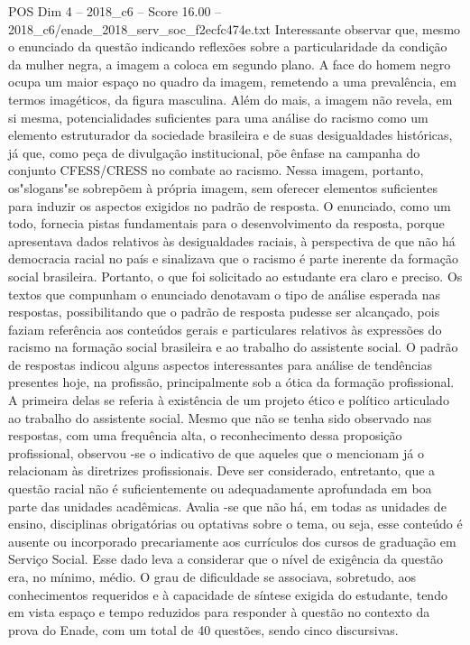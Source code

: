 \begin{textsample}{POS Dim 4 – 2018\_c6 – Score 16.00 – 2018\_c6/enade\_2018\_serv\_soc\_f2ecfc474e.txt}
Interessante observar que, mesmo o enunciado da questão indicando reflexões sobre a particularidade da condição da mulher negra, a imagem a coloca em segundo plano.
A face do homem negro ocupa um maior espaço no quadro da imagem, remetendo a uma prevalência, em termos imagéticos, da figura masculina.
Além do mais, a imagem não revela, em si mesma, potencialidades suficientes para uma análise do racismo como um elemento estruturador da sociedade brasileira e de suas desigualdades históricas, já que, como peça de divulgação institucional, põe ênfase na campanha do conjunto CFESS/CRESS no combate ao racismo.
Nessa imagem, portanto, os"slogans"se sobrepõem à própria imagem, sem oferecer elementos suficientes para induzir os aspectos exigidos no padrão de resposta.
O enunciado, como um todo, fornecia pistas fundamentais para o desenvolvimento da resposta, porque apresentava dados relativos às desigualdades raciais, à perspectiva de que não há democracia racial no país e sinalizava que o racismo é parte inerente da formação social brasileira.
Portanto, o que foi solicitado ao estudante era claro e preciso.
Os textos que compunham o enunciado denotavam o tipo de análise esperada nas respostas, possibilitando que o padrão de resposta pudesse ser alcançado, pois faziam referência aos conteúdos gerais e particulares relativos às expressões do racismo na formação social brasileira e ao trabalho do assistente social.
O padrão de respostas indicou alguns aspectos interessantes para análise de tendências presentes hoje, na profissão, principalmente sob a ótica da formação profissional.
A primeira delas se referia à existência de um projeto ético e político articulado ao trabalho do assistente social.
Mesmo que não se tenha sido observado nas respostas, com uma frequência alta, o reconhecimento dessa proposição profissional, observou -se o indicativo de que aqueles que o mencionam já o relacionam às diretrizes profissionais.
Deve ser considerado, entretanto, que a questão racial não é suficientemente ou adequadamente aprofundada em boa parte das unidades acadêmicas.
Avalia -se que não há, em todas as unidades de ensino, disciplinas obrigatórias ou optativas sobre o tema, ou seja, esse conteúdo é ausente ou incorporado precariamente aos currículos dos cursos de graduação em Serviço Social.
Esse dado leva a considerar que o nível de exigência da questão era, no mínimo, médio.
O grau de dificuldade se associava, sobretudo, aos conhecimentos requeridos e à capacidade de síntese exigida do estudante, tendo em vista espaço e tempo reduzidos para responder à questão no contexto da prova do Enade, com um total de 40 questões, sendo cinco discursivas.

\end{textsample}
